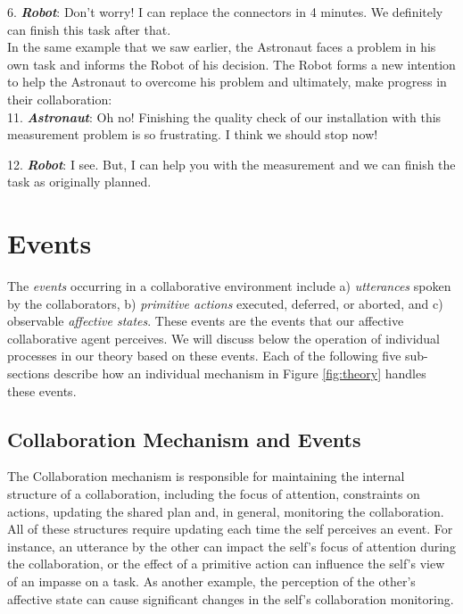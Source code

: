 \documentclass[12pt]{report}
\begin{document}
  6. \textbf{\textit{Robot}}: Don't worry! I can replace the connectors in 4
  minutes. We definitely can finish this task after that.\\
  
In the same example that we saw earlier, the Astronaut faces a problem in his
own task and informs the Robot of his decision. The Robot forms a new intention
to help the Astronaut to overcome his problem and ultimately, make progress in
their collaboration:\\
 
  11. \textbf{\textit{Astronaut}}: Oh no! Finishing the quality check of our
  installation with this measurement problem is so frustrating. I think we
  should stop now!

  12. \textbf{\textit{Robot}}: I see. But, I can help you with the measurement  
  and we can finish the task as originally planned.

\section{Events}
\label{sec:events}

The \textit{events} occurring in a collaborative environment include a)
\textit{utterances} spoken by the collaborators, b) \textit{primitive actions}
executed, deferred, or aborted, and c) observable \textit{affective states}.
These events are the events that our affective collaborative agent perceives. We
will discuss below the operation of individual processes in our theory based on
these events. Each of the following five sub-sections describe how an individual
mechanism in Figure \ref{fig:theory} handles these events.

\subsection{Collaboration Mechanism and Events}

The Collaboration mechanism is responsible for maintaining the internal
structure of a collaboration, including the focus of attention, constraints on
actions, updating the shared plan and, in general, monitoring the collaboration.
All of these structures require updating each time the self perceives an event.
For instance, an utterance by the other can impact the self's focus of attention
during the collaboration, or the effect of a primitive action can influence the
self's view of an impasse on a task. As another example, the perception of the
other's affective state can cause significant changes in the self's
collaboration monitoring.
\end{document}
